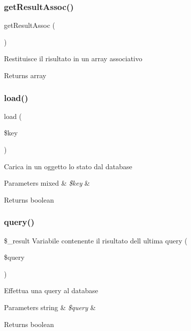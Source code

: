 \subsubsection{\texorpdfstring{get\+Result\+Assoc()}{getResultAssoc()}}
{\footnotesize\ttfamily get\+Result\+Assoc (\begin{DoxyParamCaption}{ }\end{DoxyParamCaption})}

Restituisce il risultato in un array associativo

\begin{DoxyReturn}{Returns}
array 
\end{DoxyReturn}
\mbox{\label{class_fdb_a8d0a51036af71436a1e8dcc26fc4281d}} 
\subsubsection{\texorpdfstring{load()}{load()}}
{\footnotesize\ttfamily load (\begin{DoxyParamCaption}\item[{}]{\$key }\end{DoxyParamCaption})}

Carica in un oggetto lo stato dal database


\begin{DoxyParams}[1]{Parameters}
mixed & {\em \$key} & \\
\hline
\end{DoxyParams}
\begin{DoxyReturn}{Returns}
boolean 
\end{DoxyReturn}
\mbox{\label{class_fdb_afbf3cf8f76801c717232f8a723bac177}} 
\subsubsection{\texorpdfstring{query()}{query()}}
{\footnotesize\ttfamily \$\+\_\+result Variabile contenente il risultato dell ultima query (\begin{DoxyParamCaption}\item[{}]{\$query }\end{DoxyParamCaption})}

Effettua una query al database 
\begin{DoxyParams}[1]{Parameters}
string & {\em \$query} & \\
\hline
\end{DoxyParams}
\begin{DoxyReturn}{Returns}
boolean 
\end{DoxyReturn}
\mbox{\label{class_fdb_a2fd225ebf3ec2f40d21ff95249b031b9}} 
